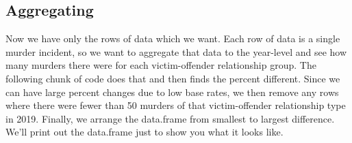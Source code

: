 \documentclass[
]{krantz}
\begin{document}
\hypertarget{aggregating}{%
\subsection{Aggregating}\label{aggregating}}

Now we have only the rows of data which we want. Each row of data is a single murder incident, so we want to aggregate that data to the year-level and see how many murders there were for each victim-offender relationship group. The following chunk of code does that and then finds the percent different. Since we can have large percent changes due to low base rates, we then remove any rows where there were fewer than 50 murders of that victim-offender relationship type in 2019. Finally, we arrange the data.frame from smallest to largest difference. We'll print out the data.frame just to show you what it looks like.
\end{document}
